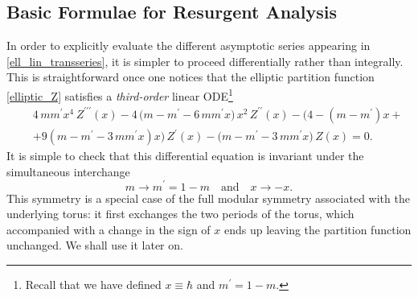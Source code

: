 \documentclass[11pt,a4paper]{article}
\newcommand{\bea}{\begin{eqnarray}}
\newcommand{\eea}{\end{eqnarray}}
\begin{document}
\subsection{Basic Formulae for Resurgent Analysis}\label{sec:ell-basic-partfunc}

In order to explicitly evaluate the different asymptotic series appearing in \eqref{ell_lin_transseries}, it is simpler to proceed differentially rather than integrally. This is straightforward once one notices that the elliptic partition function \eqref{elliptic_Z} satisfies a \textit{third-order} linear ODE\footnote{Recall that we have defined $x\equiv\hbar$ and $m^\prime=1-m$.} \cite{bdu13, cku14}
%
\bea
&& 4\, m m^\prime x^4\, Z^{\prime\prime\prime} (x) - 4\, \Big( m - m^\prime - 6\, m m^\prime x \Big)\, x^2\, Z^{\prime\prime} (x) - \Big( 4 - \left( m - m^\prime \right) x + \nonumber \\
&& + 9 \left( m - m^\prime - 3\, m m^\prime x \right) x \Big)\, Z^{\prime}(x) - \Big( m - m^\prime - 3\, m m^\prime x \Big)\, Z (x) = 0.
\label{elliptic_linear_ODE}
\eea
%
\noindent
It is simple to check that this differential equation is invariant under the simultaneous interchange
%
\begin{equation}
m \rightarrow m^\prime=1-m \quad \text{and} \quad x \rightarrow -x.
\label{modular_sym}
\end{equation}
%
\noindent
This symmetry is a special case of the full modular symmetry associated with the underlying torus: it first exchanges the two periods of the torus, which accompanied with a change in the sign of $x$ ends up leaving the partition function unchanged. We shall use it later on.
\end{document}
